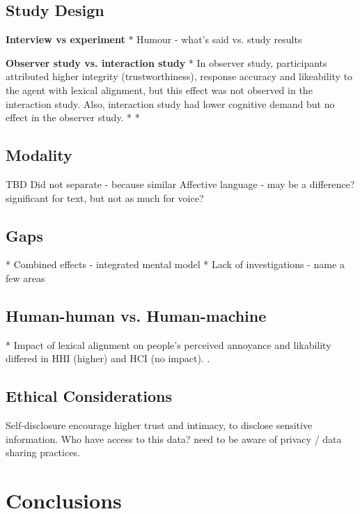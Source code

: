 \documentclass[sigconf,screen,review, anonymous]{acmart}
\newcommand{\cmt}[1]{}%
\begin{document}
\subsection{Study Design}

\textbf{Interview vs experiment}
* Humour - what's said vs. study results

\textbf{Observer study vs. interaction study}
* In observer study, participants attributed higher integrity (trustworthiness), response accuracy and likeability to the agent with lexical alignment, but this effect was not observed in the interaction study. Also, interaction study had lower cognitive demand but no effect in the observer study. \cite{linnemann2018can}\cmt{[15]}
* \cite{zhu2022effects}\cmt{[26]}
* \cite{cox2022does}\cmt{[27]}


\subsection{Modality}

TBD 
Did not separate - because similar 
Affective language - may be a difference? significant for text, but not as much for voice?

\subsection{Gaps}

* Combined effects - integrated mental model
* Lack of investigations - name a few areas

\subsection{Human-human vs. Human-machine}

* Impact of lexical alignment on people's perceived annoyance and likability differed in HHI (higher) and HCI (no impact). \cite{huiyang2022improving}\cmt{[17]}.

\subsection{Ethical Considerations}

Self-disclosure encourage higher trust and intimacy, to disclose sensitive information. Who have access to this data? need to be aware of privacy / data sharing practices. \cite{lee2020hear}\cmt{[23]}


\section{Conclusions}
\end{document}
